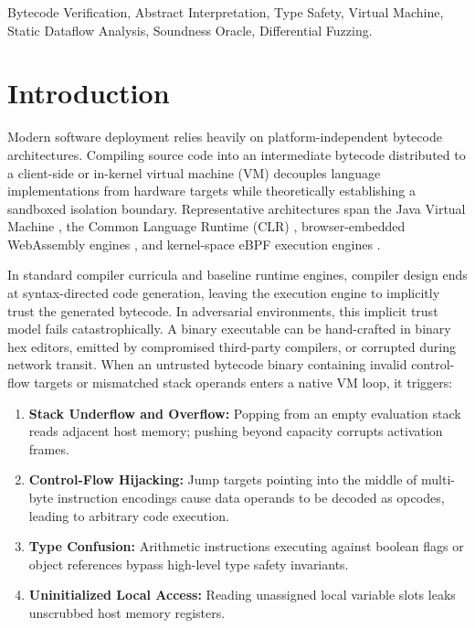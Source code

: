 \documentclass[conference]{IEEEtran}
\begin{document}
\begin{IEEEkeywords}
Bytecode Verification, Abstract Interpretation, Type Safety, Virtual Machine, Static Dataflow Analysis, Soundness Oracle, Differential Fuzzing.
\end{IEEEkeywords}

\section{Introduction}
Modern software deployment relies heavily on platform-independent bytecode architectures. Compiling source code into an intermediate bytecode distributed to a client-side or in-kernel virtual machine (VM) decouples language implementations from hardware targets while theoretically establishing a sandboxed isolation boundary. Representative architectures span the Java Virtual Machine \cite{lindholm2014java}, the Common Language Runtime (CLR) \cite{meijer2002technical}, browser-embedded WebAssembly engines \cite{haas2017bringing}, and kernel-space eBPF execution engines \cite{ebpf2023linux}.

In standard compiler curricula and baseline runtime engines, compiler design ends at syntax-directed code generation, leaving the execution engine to implicitly trust the generated bytecode. In adversarial environments, this implicit trust model fails catastrophically. A binary executable can be hand-crafted in binary hex editors, emitted by compromised third-party compilers, or corrupted during network transit. When an untrusted bytecode binary containing invalid control-flow targets or mismatched stack operands enters a native VM loop, it triggers:
\begin{enumerate}
    \item \textbf{Stack Underflow and Overflow:} Popping from an empty evaluation stack reads adjacent host memory; pushing beyond capacity corrupts activation frames.
    \item \textbf{Control-Flow Hijacking:} Jump targets pointing into the middle of multi-byte instruction encodings cause data operands to be decoded as opcodes, leading to arbitrary code execution.
    \item \textbf{Type Confusion:} Arithmetic instructions executing against boolean flags or object references bypass high-level type safety invariants.
    \item \textbf{Uninitialized Local Access:} Reading unassigned local variable slots leaks unscrubbed host memory registers.
\end{enumerate}
\end{document}
